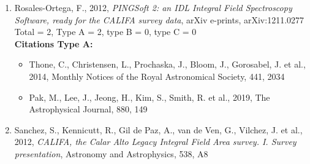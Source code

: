 \documentclass{letter}
\begin{document}
\begin{enumerate}
\begin{itemize}
\item Belfiore, F., Maiolino, R., Tremonti, C., Sanchez, S., Bundy, K. et al., 2017, Monthly Notices of the Royal Astronomical Society, 469, 151
\item Japelj, J., Laigle, C., Puech, M., Pichon, C., Rahmani, H. et al., 2019, Astronomy and Astrophysics, 632, A94
\end{itemize}
{\bf Citations Type B:}
\begin{itemize}
\item Piqueras Lopez, J., Colina, L., Arribas, S., Alonso-Herrero, A., Bedregal, A., 2012, Astronomy and Astrophysics, 546, A64
\item Arribas, S., Colina, L., Bellocchi, E., Maiolino, R., Villar-Martin, M., 2014, Astronomy and Astrophysics, 568, A14
\item Cazzoli, S., Arribas, S., Colina, L., Piqueras-Lopez, J., Bellocchi, E. et al., 2014, Astronomy and Astrophysics, 569, A14
\item Cazzoli, S., Arribas, S., Maiolino, R., Colina, L., 2016, Astronomy and Astrophysics, 590, A125
\item Rodriguez del Pino, B., Arribas, S., Piqueras Lopez, J., Villar-Martin, M., Colina, L., 2019, Monthly Notices of the Royal Astronomical Society, 486, 344
\end{itemize}
\item Rosales-Ortega, F., 2012, {\it PINGSoft 2: an IDL Integral Field Spectroscopy Software, ready for the CALIFA survey data}, arXiv e-prints, arXiv:1211.0277 \\ 
Total = 2, Type A = 2, type B = 0, type C = 0 \\ 
{\bf Citations Type A:}
\begin{itemize}
\item Thone, C., Christensen, L., Prochaska, J., Bloom, J., Gorosabel, J. et al., 2014, Monthly Notices of the Royal Astronomical Society, 441, 2034
\item Pak, M., Lee, J., Jeong, H., Kim, S., Smith, R. et al., 2019, The Astrophysical Journal, 880, 149
\end{itemize}
\item Sanchez, S., Kennicutt, R., Gil de Paz, A., van de Ven, G., Vilchez, J. et al., 2012, {\it CALIFA, the Calar Alto Legacy Integral Field Area survey. I. Survey presentation}, Astronomy and Astrophysics, 538, A8 \\ 

\end{enumerate}
\end{document}
